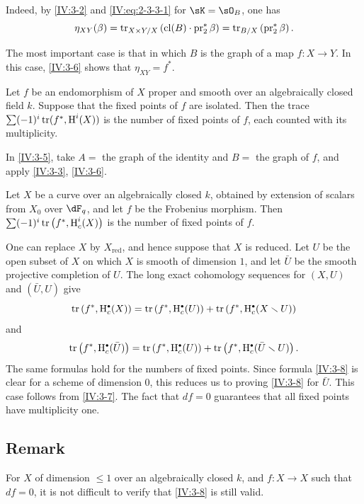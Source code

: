 Indeed, by \ref{IV:3-2} and \eqref{IV:eq:2-3-3-1} for $\sK=\sO_B$, one has
\[
  \eta_{X Y}(\beta) = \operatorname{tr}_{X\times Y/X}\left(\operatorname{cl}(B)\cdot \operatorname{pr}_2^\ast\beta\right) = \operatorname{tr}_{B/X}\left(\operatorname{pr}_2^\ast \beta\right) \text{.}
\]

The most important case is that in which $B$ is the graph of a map
$f:X\to Y$. In this case, \ref{IV:3-6} shows that $\eta_{X Y}=f^\ast$.






\begin{corollary_}\label{IV:3-7}
Let $f$ be an endomorphism of $X$ proper and smooth over an algebraically
closed field $k$. Suppose that the fixed points of $f$ are isolated. Then the
trace $\sum (-1)^i \operatorname{tr}(f^\ast,\operatorname{H}^i(X))$ is the number of fixed points of $f$,
each counted with its multiplicity.
\end{corollary_}

In \ref{IV:3-5}, take $A=$ the graph of the identity and $B=$ the graph of
$f$, and apply \ref{IV:3-3}, \ref{IV:3-6}.






\begin{corollary_}\label{IV:3-8}
Let $X$ be a curve over an algebraically closed $k$, obtained by extension of
scalars from $X_0$ over $\dF_q$, and let $f$ be the Frobenius morphism. Then
$\sum (-1)^i \operatorname{tr}\left(f^\ast,\operatorname{H}_c^i(X)\right)$ is the number of fixed
points of $f$.
\end{corollary_}

One can replace $X$ by $X_\text{red}$, and hence suppose that $X$ is reduced.
Let $U$ be the open subset of $X$ on which $X$ is smooth of dimension $1$,
and let $\bar U$ be the smooth projective completion of $U$. The long exact
cohomology sequences for $(X,U)$ and $(\bar U,U)$ give
\[
  \tr\left(f^\ast,\h_c^\bullet(X)\right) = \tr\left(f^\ast,\h_c^\bullet(U)\right) + \tr\left(f^\ast,\h_c^\bullet(X\setminus U)\right)
\]
and
\[
  \tr\left(f^\ast,\h_c^\bullet(\bar U)\right) = \tr\left(f^\ast,\h_c^\bullet(U)\right) + \tr\left(f^\ast,\h_c^\bullet(\bar U\setminus U)\right) \text{.}
\]
The same formulas hold for the numbers of fixed points. Since formula
\ref{IV:3-8} is clear for a scheme of dimension $0$, this reduces us to
proving \ref{IV:3-8} for $\bar U$. This case follows from \ref{IV:3-7}. The
fact that $d f=0$ guarantees that all fixed points have multiplicity one.






\subsection{Remark}\label{IV:3-9}

For $X$ of dimension $\leqslant 1$ over an algebraically closed $k$, and
$f:X\to X$ such that $d f=0$, it is not difficult to verify that
\ref{IV:3-8} is still valid.
